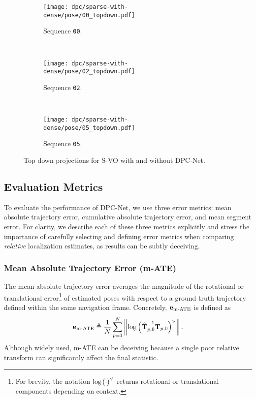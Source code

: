 \begin{figure}
    \centering
    \begin{subfigure}{0.42\textwidth}
        \texttt{[image: dpc/sparse-with-dense/pose/00\_topdown.pdf]}
        \label{00-top-down}
        \caption{Sequence \texttt{00}.}
    \end{subfigure}
    ~
    \begin{subfigure}{0.42\textwidth}
        \texttt{[image: dpc/sparse-with-dense/pose/02\_topdown.pdf]}
        \label{02-top-down}
        \caption{Sequence \texttt{02}.}
    \end{subfigure}
    ~
    \begin{subfigure}{0.42\textwidth}
        \texttt{[image: dpc/sparse-with-dense/pose/05\_topdown.pdf]}
        \label{05-top-down}
        \caption{Sequence \texttt{05}.}
    \end{subfigure}
   \caption{Top down projections for S-VO with and without DPC-Net.}
  \label{fig:top-downs} 
\end{figure}

\subsection{Evaluation Metrics}
To evaluate the performance of DPC-Net, we use three error metrics: mean absolute trajectory error, cumulative absolute trajectory error, and mean segment error. For clarity, we describe each of these three metrics explicitly and stress the importance of carefully selecting and defining error metrics when comparing \textit{relative} localization estimates, as results can be subtly deceiving.

\subsubsection{Mean Absolute Trajectory Error (m-ATE)} The mean absolute trajectory error averages the magnitude of the rotational or translational error\footnote{For brevity, the notation $\mathrm{log}\left({\cdot}\right)^{\vee}$ returns rotational or translational components depending on context.} of estimated poses with respect to a ground truth trajectory defined within the same navigation frame. Concretely, $\boldsymbol{\mathbf{e}}_\text{m-ATE}$ is defined as
\begin{equation}
	\boldsymbol{\mathbf{e}}_\text{m-ATE} \triangleq \frac{1}{N} \sum_{p=1}^{N} \left\Vert\mathrm{log}\left({\hat{\boldsymbol{\mathbf{T}}}^{-1}_{p,0} \boldsymbol{\mathbf{T}}_{p,0}}\right)^{\vee}\right\Vert.
\end{equation}
Although widely used, m-ATE can be deceiving because a single poor relative transform can significantly affect the final statistic.

